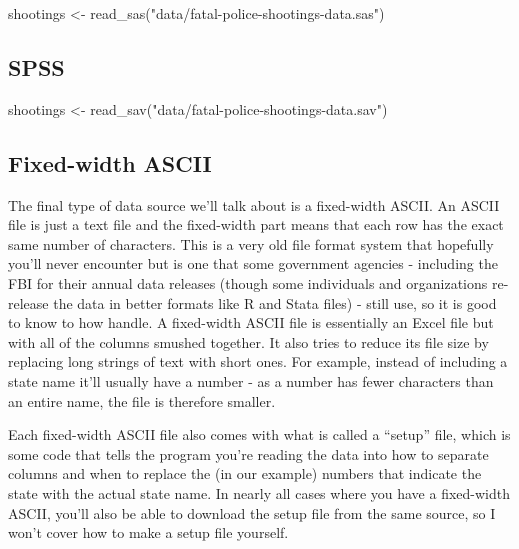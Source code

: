 \documentclass[
  a4paper,
]{krantz}
\makeatletter
\newenvironment{Shaded}{\begin{snugshade}}{\end{snugshade}}
\newcommand{\FunctionTok}[1]{\textcolor[rgb]{0,0,0}{#1}}
\newcommand{\NormalTok}[1]{#1}
\newcommand{\OtherTok}[1]{\textcolor[rgb]{0.37,0.37,0.37}{#1}}
\newcommand{\StringTok}[1]{\textcolor[rgb]{0.5,0.5,0.5}{#1}}
\newenvironment{kframe}{%
\medskip{}
\setlength{\fboxsep}{.8em}
 \def\at@end@of@kframe{}%
 \ifinner\ifhmode%
  \def\at@end@of@kframe{\end{minipage}}%
  \begin{minipage}{\columnwidth}%
 \fi\fi%
 \def\FrameCommand##1{\hskip\@totalleftmargin \hskip-\fboxsep
 \colorbox{shadecolor}{##1}\hskip-\fboxsep
     \hskip-\linewidth \hskip-\@totalleftmargin \hskip\columnwidth}%
 \MakeFramed {\advance\hsize-\width
   \@totalleftmargin\z@ \linewidth\hsize
   \@setminipage}}%
 {\par\unskip\endMakeFramed%
 \at@end@of@kframe}
\renewenvironment{Shaded}{\begin{kframe}}{\end{kframe}}
\makeatother
\begin{document}
\begin{Shaded}
\begin{Highlighting}[]
\NormalTok{shootings }\OtherTok{\textless{}{-}} \FunctionTok{read\_sas}\NormalTok{(}\StringTok{"data/fatal{-}police{-}shootings{-}data.sas"}\NormalTok{)}
\end{Highlighting}
\end{Shaded}

\hypertarget{spss}{%
\subsection{SPSS}\label{spss}}

\begin{Shaded}
\begin{Highlighting}[]
\NormalTok{shootings }\OtherTok{\textless{}{-}} \FunctionTok{read\_sav}\NormalTok{(}\StringTok{"data/fatal{-}police{-}shootings{-}data.sav"}\NormalTok{)}
\end{Highlighting}
\end{Shaded}

\hypertarget{fixed-width-ascii}{%
\subsection{Fixed-width ASCII}\label{fixed-width-ascii}}

The final type of data source we'll talk about is a
fixed-width ASCII. An ASCII file is just a text file and the
fixed-width part means that each row has the exact same
number of characters. This is a very old file format system
that hopefully you'll never encounter but is one that some
government agencies - including the FBI for their annual
data releases (though some individuals and organizations
re-release the data in better formats like R and Stata
files) - still use, so it is good to know to how handle. A
fixed-width ASCII file is essentially an Excel file but with
all of the columns smushed together. It also tries to reduce
its file size by replacing long strings of text with short
ones. For example, instead of including a state name it'll
usually have a number - as a number has fewer characters
than an entire name, the file is therefore smaller.

Each fixed-width ASCII file also comes with what is called a
``setup'' file, which is some code that tells the program
you're reading the data into how to separate columns and
when to replace the (in our example) numbers that indicate
the state with the actual state name. In nearly all cases
where you have a fixed-width ASCII, you'll also be able to
download the setup file from the same source, so I won't
cover how to make a setup file yourself.
\end{document}
